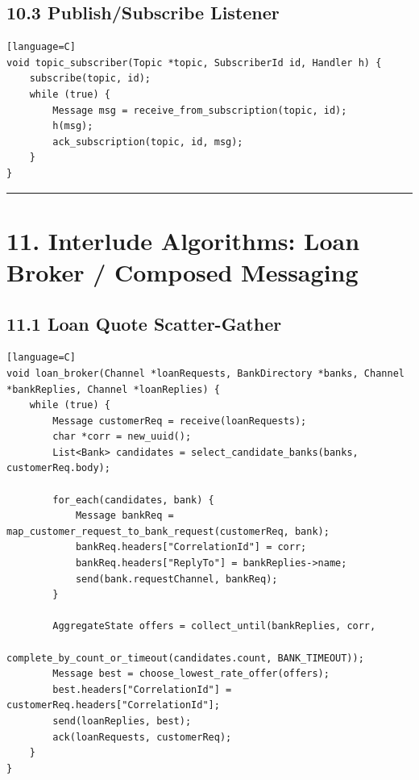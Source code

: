 \documentclass[11pt]{article}
\begin{document}
\subsection{10.3 Publish/Subscribe
Listener}\label{publishsubscribe-listener}

\begin{verbatim}[language=C]
void topic_subscriber(Topic *topic, SubscriberId id, Handler h) {
    subscribe(topic, id);
    while (true) {
        Message msg = receive_from_subscription(topic, id);
        h(msg);
        ack_subscription(topic, id, msg);
    }
}
\end{verbatim}

\begin{center}\rule{0.5\linewidth}{0.5pt}\end{center}

\section{11. Interlude Algorithms: Loan Broker / Composed
Messaging}\label{interlude-algorithms-loan-broker-composed-messaging}

\subsection{11.1 Loan Quote
Scatter-Gather}\label{loan-quote-scatter-gather}

\begin{verbatim}[language=C]
void loan_broker(Channel *loanRequests, BankDirectory *banks, Channel *bankReplies, Channel *loanReplies) {
    while (true) {
        Message customerReq = receive(loanRequests);
        char *corr = new_uuid();
        List<Bank> candidates = select_candidate_banks(banks, customerReq.body);

        for_each(candidates, bank) {
            Message bankReq = map_customer_request_to_bank_request(customerReq, bank);
            bankReq.headers["CorrelationId"] = corr;
            bankReq.headers["ReplyTo"] = bankReplies->name;
            send(bank.requestChannel, bankReq);
        }

        AggregateState offers = collect_until(bankReplies, corr,
                                             complete_by_count_or_timeout(candidates.count, BANK_TIMEOUT));
        Message best = choose_lowest_rate_offer(offers);
        best.headers["CorrelationId"] = customerReq.headers["CorrelationId"];
        send(loanReplies, best);
        ack(loanRequests, customerReq);
    }
}
\end{verbatim}
\end{document}
